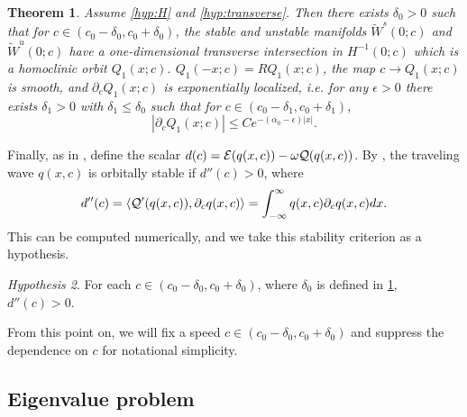 \documentclass[12pt]{elsarticle}
\theoremstyle{plain}
\newtheorem{theorem}{Theorem}
\theoremstyle{definition}
\theoremstyle{remark}
\newtheorem{hypothesis}[theorem]{Hypothesis}
\numberwithin{theorem}{section}
\numberwithin{equation}{section}
\begin{document}
\begin{theorem}\label{transverseint}
Assume \cref{hyp:H} and \cref{hyp:transverse}. Then there exists $\delta_0 > 0$ such that for $c \in (c_0 - \delta_0, c_0 + \delta_0)$, the stable and unstable manifolds $\tilde{W}^s(0; c)$ and $\tilde{W}^u(0; c)$ have a one-dimensional transverse intersection in $H^{-1}(0; c)$ which is a homoclinic orbit $Q_1(x; c)$. $Q_1(-x; c) = R Q_1(x; c)$, the map $c \rightarrow Q_1(x; c)$ is smooth, and $\partial_c Q_1(x; c)$ is exponentially localized, i.e. for any $\epsilon > 0$ there exists $\delta_1 > 0$ with $\delta_1 \leq \delta_0$ such that for $c \in (c_0 - \delta_1, c_0 + \delta_1)$,
\begin{equation}\label{Qcbound}
|\partial_c Q_1(x; c)| \leq C e^{-(\alpha_0 - \epsilon)|x|}.
\end{equation}
\end{theorem}

Finally, as in \cite{Grillakis1987}, define the scalar $d(c) = \mathcal{E}(q(x, c)) - \omega\mathcal{Q}(q(x, c))$. By \cite{Bona1987,Grillakis1987}, the traveling wave $q(x, c)$ is orbitally stable if $d''(c) > 0$, where
\begin{align}\label{ddoubleprime}
d''(c) = \langle \mathcal{Q}'(q(x, c)), \partial_c q(x, c) \rangle
= \int_{-\infty}^\infty q(x, c) \partial_c q(x, c) dx.
\end{align}
This can be computed numerically, and we take this stability criterion as a hypothesis.

\begin{hypothesis}\label{hyp:dccpos}
For each $c \in (c_0 - \delta_0, c_0 + \delta_0)$, where $\delta_0$ is defined in \cref{transverseint}, $d''(c) > 0$.
\end{hypothesis}

\noi From this point on, we will fix a speed $c \in (c_0 - \delta_0, c_0 + \delta_0)$ and suppress the dependence on $c$ for notational simplicity.

\subsection{Eigenvalue problem}\label{sec:EVP}
\end{document}
